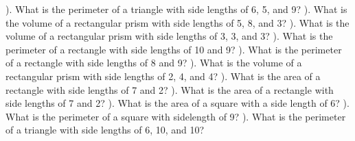 \documentclass{article}%
\begin{document}
\newline%
\newline%
). What is the perimeter of a triangle with side lengths of 6, 5, and 9?%
\newline%
\newline%
). What is the volume of a rectangular prism with side lengths of 5, 8, and 3?%
\newline%
\newline%
). What is the volume of a rectangular prism with side lengths of 3, 3, and 3?%
\newline%
\newline%
). What is the perimeter of a rectangle with side lengths of 10 and 9?%
\newline%
\newline%
). What is the perimeter of a rectangle with side lengths of 8 and 9?%
\newline%
\newline%
). What is the volume of a rectangular prism with side lengths of 2, 4, and 4?%
\newline%
\newline%
). What is the area of a rectangle with side lengths of 7 and 2?%
\newline%
\newline%
). What is the area of a rectangle with side lengths of 7 and 2?%
\newline%
\newline%
). What is the area of a square with a side length of 6?%
\newline%
\newline%
). What is the perimeter of a square with sidelength of 9?%
\newline%
\newline%
). What is the perimeter of a triangle with side lengths of 6, 10, and 10?%
\newline%
\newline%
\newline%
\end{document}
